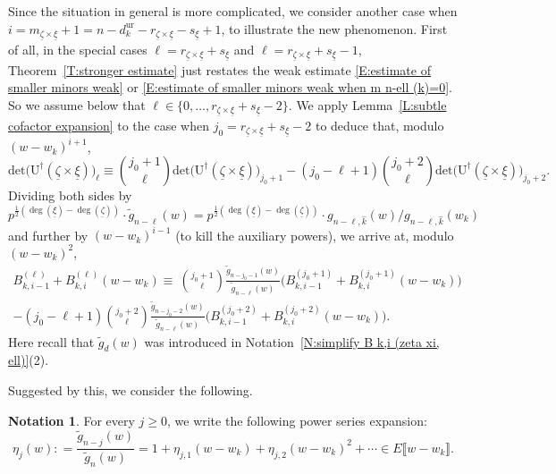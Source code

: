 \documentclass[12pt]{amsart}
\theoremstyle{definition}
\newtheorem{notation}[subsection]{Notation}
\numberwithin{equation}{subsection}
\def\rmU{\mathrm{U}}
\newcommand{\Iw}{\mathrm{Iw}}
\renewcommand{\det}{\mathrm{det}}
\newcommand{\ur}{\mathrm{ur}}
\begin{document}
\medskip
Since the situation in general is more complicated, we consider another case when $i=m_{\underline \zeta \times \underline \xi}+1 = n-d_k^\ur - r_{\underline \zeta \times \underline \xi}-s_{\underline\xi} +1 $, to illustrate the new phenomenon. First of all, in the special cases $\ell = r_{\underline \zeta \times \underline \xi}+s_{\underline \xi}$ and $\ell = r_{\underline \zeta \times \underline \xi}+s_{\underline \xi}-1$, Theorem~\ref{T:stronger estimate} just restates the weak estimate \eqref{E:estimate of smaller minors weak} or \eqref{E:estimate of smaller minors weak when m n-ell (k)=0}.
So we assume below that $\ell \in \{0, \dots, r_{\underline \zeta \times \underline \xi} + s_{\underline \xi}-2\}$. %
We apply Lemma~\ref{L:subtle cofactor expansion} to the case when $j_0 = r_{\underline\zeta \times \underline \xi}+s_{\underline \xi}-2$ to deduce that, modulo  $ (w-w_k)^{i+1}$,
$$
\det\big(\rmU^\dagger(\underline \zeta \times \underline \xi)\big)_\ell  \equiv \binom{j_0+1}{\ell} \det\big(\rmU^\dagger(\underline \zeta \times \underline \xi)\big)_{j_0+1} -(j_0-\ell+1) \binom{j_0+2}{\ell} \det\big(\rmU^\dagger(\underline \zeta \times \underline \xi)\big)_{j_0+2}.
$$
Dividing both sides by $p^{\frac 12(\deg(\underline \xi) - \deg(\underline \zeta))}\cdot \tilde{g}_{n-\ell}(w)= p^{\frac 12(\deg(\underline \xi) - \deg(\underline \zeta))}\cdot g_{n - \ell,\hat k}(w) / g_{n-\ell,\hat k}(w_k)$ and further by $(w-w_k)^{i-1}$ (to kill the auxiliary powers), we arrive at, modulo $(w-w_k)^{2}$,
\begin{align}
\label{E:cofactor expansion cosize 2}
B^{( \ell)}_{k, i-1} + B^{(\ell)}_{k, i} (w-w_k)
\equiv\ \binom{j_0+1}{\ell}\frac{\tilde{g}_{n-j_0-1}(w) }{\tilde{g}_{n-\ell}(w) } \Big( B^{( j_0+1)}_{k, i-1}  + B^{(j_0+1)}_{k, i} (w-w_k)\Big) \qquad
\\
\nonumber
-(j_0-\ell+1) \binom{j_0+2}\ell \frac{\tilde{g}_{n-j_0-2}(w) }{\tilde{g}_{n-\ell}(w) } \Big( B^{( j_0+2)}_{k, i-1}  + B^{( j_0+2)}_{k, i} (w-w_k)\Big).
\end{align}
Here recall that $\tilde g_d(w)$ was introduced in Notation~\ref{N:simplify B k,i (zeta xi, ell)}(2).


Suggested by this, we consider the following.
\begin{notation}
\label{N:eta}
For every $j  \geq 0$, we write the following power series expansion:
\begin{equation}
\label{E:definition of eta}
\eta_{j}(w): = \frac{\tilde{g}_{n-j}(w) }{\tilde{g}_{n}(w) } = 1+ \eta_{j, 1}(w-w_k) + \eta_{j,2}(w-w_k)^2 + \cdots \in E\llbracket w-w_k\rrbracket.
\end{equation}
\end{notation}
\end{document}
